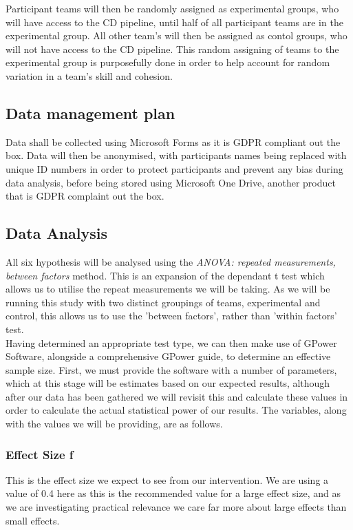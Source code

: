 \documentclass[journal]{IEEEtran}
\begin{document}
Participant teams will then be randomly assigned as experimental groups, who will have access to the CD pipeline, until half of all participant teams are in the experimental group. All other team's will then be assigned as contol groups, who will not have access to the CD pipeline. This random assigning of teams to the experimental group is purposefully done in order to help account for random variation in a team's skill and cohesion.

\subsection{Data management plan}
Data shall be collected using Microsoft Forms as it is GDPR compliant out the box. Data will then be anonymised, with participants names being replaced with unique ID numbers in order to protect participants and prevent any bias during data analysis, before being stored using Microsoft One Drive, another product that is GDPR complaint out the box.

\subsection{Data Analysis}
All six hypothesis will be analysed using the \textit{ANOVA: repeated measurements, between factors} method. This is an expansion of the dependant t test\cite{carvadiaANOVA} which allows us to utilise the repeat measurements we will be taking. As we will be running this study with two distinct groupings of teams, experimental and control, this allows us to use the 'between factors', rather than 'within factors' test\cite{carvadiaANOVA}. \\
Having determined an appropriate test type, we can then make use of GPower Software\cite{faul2007g,faul2009statistical}, alongside a comprehensive GPower guide\cite{gpowerguide}, to determine an effective sample size. First, we must provide the software with a number of parameters, which at this stage will be estimates based on our expected results, although after our data has been gathered we will revisit this and calculate these values in order to calculate the actual statistical power of our results. The variables, along with the values we will be providing, are as follows.\\

\subsubsection*{Effect Size f}
This is the effect size we expect to see from our intervention. We are using a value of 0.4 here as this is the recommended value for a large effect size\cite{cohen1992power}, and as we are investigating practical relevance we care far more about large effects than small effects.\\
\end{document}
